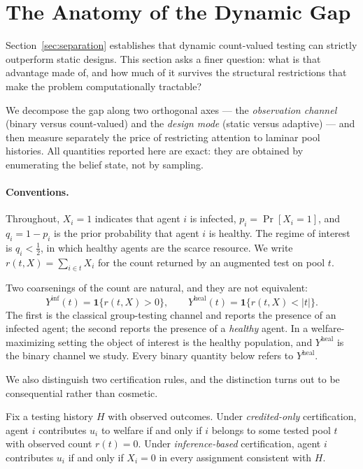 \section{The Anatomy of the Dynamic Gap}
\label{sec:anatomy}

Section~\ref{sec:separation} establishes that dynamic count-valued testing can
strictly outperform static designs. This section asks a finer question: what is
that advantage made of, and how much of it survives the structural restrictions
that make the problem computationally tractable?

We decompose the gap along two orthogonal axes --- the \emph{observation
channel} (binary versus count-valued) and the \emph{design mode} (static versus
adaptive) --- and then measure separately the price of restricting attention to
laminar pool histories. All quantities reported here are exact: they are
obtained by enumerating the belief state, not by sampling.

\paragraph{Conventions.}
Throughout, $X_i=1$ indicates that agent $i$ is infected, $p_i=\Pr[X_i=1]$, and
$q_i=1-p_i$ is the prior probability that agent $i$ is healthy. The regime of
interest is $q_i<\tfrac12$, in which healthy agents are the scarce resource. We
write $r(t,X)=\sum_{i\in t}X_i$ for the count returned by an augmented test on
pool $t$.

Two coarsenings of the count are natural, and they are not equivalent:
\[
  Y^{\mathrm{inf}}(t)=\mathbf{1}\{r(t,X)>0\},
  \qquad
  Y^{\mathrm{heal}}(t)=\mathbf{1}\{r(t,X)<|t|\}.
\]
The first is the classical group-testing channel and reports the presence of an
infected agent; the second reports the presence of a \emph{healthy} agent. In a
welfare-maximizing setting the object of interest is the healthy population, and
$Y^{\mathrm{heal}}$ is the binary channel we study. Every binary quantity below
refers to $Y^{\mathrm{heal}}$.

We also distinguish two certification rules, and the distinction turns out to be
consequential rather than cosmetic.

\begin{definition}
\label{def:certification}
Fix a testing history $H$ with observed outcomes. Under \emph{credited-only}
certification, agent $i$ contributes $u_i$ to welfare if and only if $i$ belongs
to some tested pool $t$ with observed count $r(t)=0$. Under
\emph{inference-based} certification, agent $i$ contributes $u_i$ if and only if
$X_i=0$ in every assignment consistent with $H$.
\end{definition}


